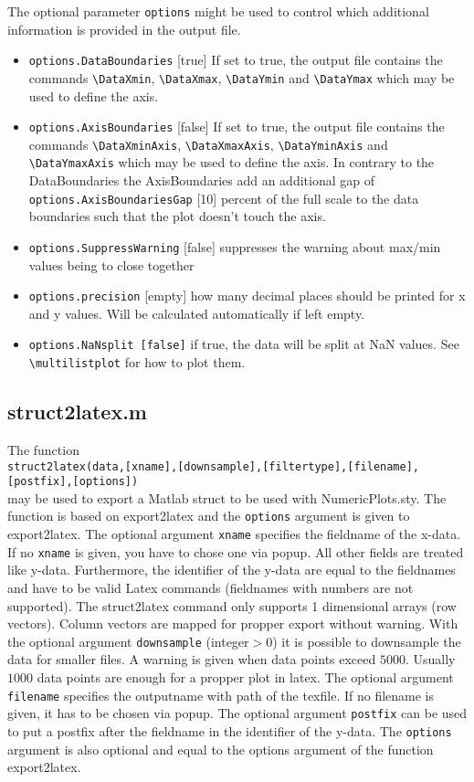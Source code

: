 The optional parameter \texttt{options} might be used to control which
additional information is provided in the output file.
\begin{itemize}
	\item \texttt{options.DataBoundaries} [true] If set to true, the output file
	contains the commands \verb+\DataXmin+, \verb+\DataXmax+, \verb+\DataYmin+ and
	\verb+\DataYmax+ which may be used to define the axis.
	\item \texttt{options.AxisBoundaries} [false] If set to true, the output file
	contains the commands \verb+\DataXminAxis+, \verb+\DataXmaxAxis+,
	\verb+\DataYminAxis+ and \verb+\DataYmaxAxis+ which may be used to define the
	axis. In contrary to the DataBoundaries the AxisBoundaries add an additional
	gap of \texttt{options.AxisBoundariesGap} [10] percent of the full scale to
	the data boundaries such that the plot doesn't touch the axis.
	\item \texttt{options.SuppressWarning} [false] suppresses the warning about
	max/min values being to close together
	\item \texttt{options.precision} [empty] how many decimal places should be
	printed for x and y values. Will be calculated automatically if left empty.
	\item \texttt{options.NaNsplit [false]} if true, the data will be split at NaN
	values. See \verb+\multilistplot+ for how to plot them.
\end{itemize}

\subsection{struct2latex.m}
The function\\
\texttt{struct2latex(data,[xname],[downsample],[filtertype],[filename],[postfix],[options])}\\
may be used to export a Matlab struct to be used with NumericPlots.sty. The
function is based on export2latex and the \verb+options+ argument is given to
export2latex. The optional argument \verb+xname+ specifies the fieldname of the
x-data. If no \verb+xname+ is given, you have to chose one via popup. All other
fields are treated like y-data. Furthermore, the identifier of the y-data are
equal to the fieldnames and have to be valid Latex commands (fieldnames with
numbers are not supported). The struct2latex command only supports 1 dimensional
arrays (row vectors). Column vectors are mapped for propper export without
warning. With the optional argument \verb+downsample+ (integer$>0$) it is
possible to downsample the data for smaller files. A warning is given when data
points exceed $5000$. Usually $1000$ data points are enough for a propper plot
in latex. The optional argument \verb+filename+ specifies the outputname with
path of the texfile. If no filename is given, it has to be chosen via popup. The
optional argument \verb+postfix+ can be used to put a postfix after the
fieldname in the identifier of the y-data. The \verb+options+ argument is also
optional and equal to the options argument of the function export2latex.

